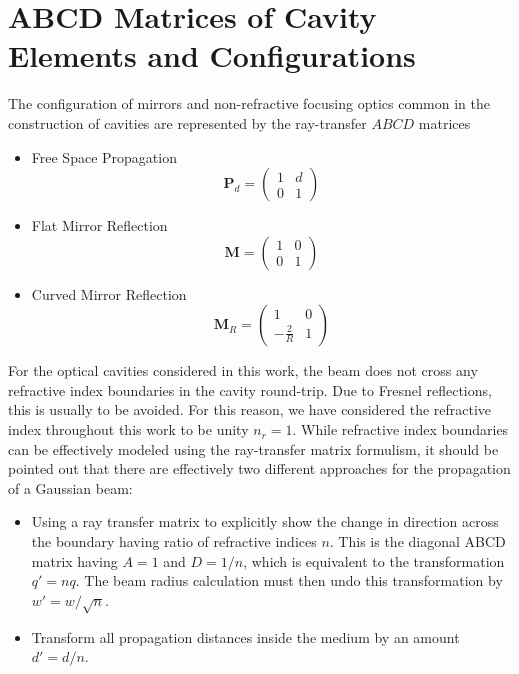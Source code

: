 \section{ABCD Matrices of Cavity Elements and Configurations}
The configuration of mirrors and non-refractive focusing optics common in the construction of cavities are represented by the ray-transfer $ABCD$ matrices	
\begin{itemize}
	\item Free Space Propagation
	\begin{equation} \label{mat_prop}
		\mathbf{P}_d = 
		\begin{pmatrix}
			1 & d \\
			0 & 1
		\end{pmatrix}
	\end{equation}
	\item Flat Mirror Reflection
	\begin{equation*}
		\mathbf{M} = 
		\begin{pmatrix}
			1 & 0 \\
			0 & 1
		\end{pmatrix}
	\end{equation*}
	\item Curved Mirror Reflection
	\begin{equation*}
		\mathbf{M}_R = 
		\begin{pmatrix}
			1 & 0 \\
			-\frac{2}{R} & 1
		\end{pmatrix}
	\end{equation*}
\end{itemize}

For the optical cavities considered in this work, the beam does not cross any refractive index boundaries in the cavity round-trip. Due to Fresnel reflections, this is usually to be avoided. For this reason, we have considered the refractive index throughout this work to be unity $n_r = 1$. While refractive index boundaries can be effectively modeled using the ray-transfer matrix formulism, it should be pointed out that there are effectively two different approaches for the propagation of a Gaussian beam:
\begin{itemize}
	\item Using a ray transfer matrix to explicitly show the change in direction across the boundary having ratio of refractive indices $n$. This is the diagonal ABCD matrix having $A=1$ and $D=1/n$, which is equivalent to the transformation $q' = nq$. The beam radius calculation must then undo this transformation by $w' = w/ \sqrt{n}$.
	
	\item Transform all propagation distances inside the medium by an amount $d' = d/n$.
\end{itemize}

